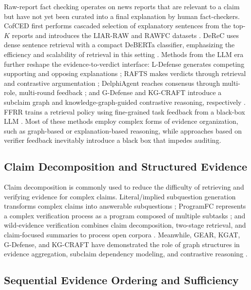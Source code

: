 \documentclass[letterpaper]{article}
\begin{document}
Raw-report fact checking operates on news reports that are relevant to a claim but have not yet been curated into a final explanation by human fact-checkers. CofCED first performs cascaded selection of explanatory sentences from the top-$K$ reports and introduces the LIAR-RAW and RAWFC datasets \citep{Yang2022CofCED}. DeReC uses dense sentence retrieval with a compact DeBERTa classifier, emphasizing the efficiency and scalability of retrieval in this setting \citep{Qazi2025DeReC}. Methods from the LLM era further reshape the evidence-to-verdict interface: L-Defense generates competing supporting and opposing explanations \citep{Wang2024LDefense}; RAFTS makes verdicts through retrieval and contrastive argumentation \citep{Yue2024RAFTS}; DelphiAgent reaches consensus through multi-role, multi-round feedback \citep{Xiong2025DelphiAgent}; and G-Defense and KG-CRAFT introduce a subclaim graph and knowledge-graph-guided contrastive reasoning, respectively \citep{Wang2026GDefense,Lourenco2026KGCRAFT}. FFRR trains a retrieval policy using fine-grained task feedback from a black-box LLM \citep{Zhang2024FFRR}. Most of these methods employ complex forms of evidence organization, such as graph-based or explanation-based reasoning, while approaches based on verifier feedback inevitably introduce a black box that impedes auditing. 

\subsection{Claim Decomposition and Structured Evidence}

Claim decomposition is commonly used to reduce the difficulty of retrieving and verifying evidence for complex claims. Literal/implied subquestion generation transforms complex claims into answerable subquestions \citep{Chen2022ClaimDecomp}; ProgramFC represents a complex verification process as a program composed of multiple subtasks \citep{Pan2023ProgramFC}; and wild-evidence verification combines claim decomposition, two-stage retrieval, and claim-focused summaries to process open corpora \citep{Chen2023WildEvidence}. Meanwhile, GEAR, KGAT, G-Defense, and KG-CRAFT have demonstrated the role of graph structures in evidence aggregation, subclaim dependency modeling, and contrastive reasoning \citep{Zhou2019GEAR,Liu2019KGAT,Wang2026GDefense,Lourenco2026KGCRAFT}. 

\subsection{Sequential Evidence Ordering and Sufficiency}
\end{document}
